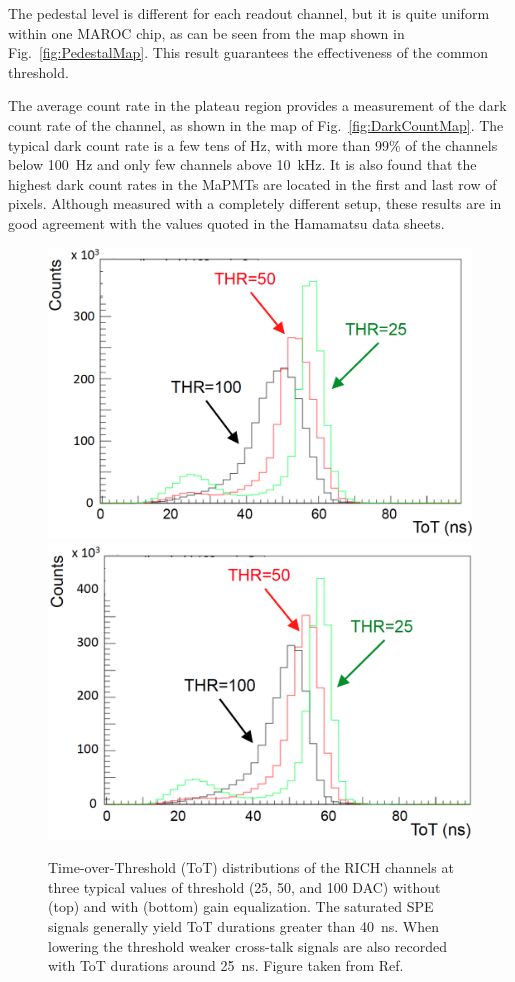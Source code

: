 \documentclass[5p,times,twocolumn]{elsarticle}
\begin{document}
The pedestal level is different for each readout channel, but it is quite uniform within one MAROC chip, as can be
seen from the map shown in Fig.~\ref{fig:PedestalMap}. This result guarantees the effectiveness of the common
threshold.

The average count rate in the plateau region provides a measurement of the dark count rate of the channel, as shown
in the map of Fig.~\ref{fig:DarkCountMap}. The typical dark count rate is a few tens of Hz, with more than 99\% of
the channels below 100~Hz and only few channels above 10~kHz. It is also found that the highest dark count rates in
the MaPMTs are located in the first and last row of pixels. Although measured with a completely different setup,
these results are in good agreement with the values quoted in the Hamamatsu data sheets.

\begin{figure}[t]
\begin{center}
\includegraphics[width=0.95\columnwidth]{Equalize_before.png}
\includegraphics[width=0.95\columnwidth]{Equalize_after.png}
\end{center}
\caption{Time-over-Threshold (ToT) distributions of the RICH channels at three typical values of threshold (25, 50, and 100 DAC) without (top) and with (bottom) gain equalization. The saturated SPE signals generally yield ToT durations greater than 40~ns. When lowering the threshold weaker cross-talk signals are also recorded with ToT durations around 25~ns. Figure taken from Ref.~\cite{Ref:RICHElectro}}
\label{Fig:Equali}
\end{figure}
\end{document}
